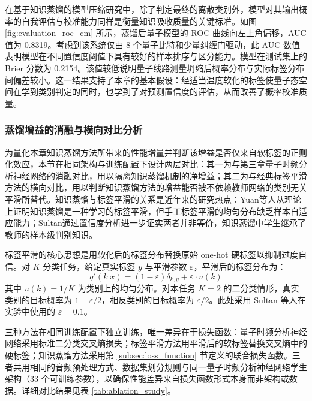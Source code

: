 在基于知识蒸馏的模型压缩研究中，除了判定最终的离散类别外，模型对其输出概率的自我评估与校准能力同样是衡量知识吸收质量的关键标准。如图 \ref{fig:evaluation_roc_cm} 所示，蒸馏后量子模型的 ROC 曲线向左上角偏移，AUC 值为 0.8319。考虑到该系统仅由 8 个量子比特和少量纠缠门驱动，此 AUC 数值表明模型在不同置信度阈值下具有较好的样本排序与区分能力。模型在测试集上的 Brier 分数为 0.2154。该值较低说明量子线路测量坍缩后概率分布与实际标签分布间偏差较小。这一结果支持了本章的基本假设：经适当温度软化的标签使量子态空间在学到类别判定的同时，也学到了对预测置信度的评估，从而改善了概率校准质量。

\subsubsection{蒸馏增益的消融与横向对比分析}
\label{subsec:ablation_study}

为量化本章知识蒸馏方法所带来的性能增量并判断该增益是否仅来自软标签的正则化效应，本节在相同架构与训练配置下设计两层对比：其一为与第三章量子时频分析神经网络的消融对比，用以隔离知识蒸馏机制的净增益；其二为与经典标签平滑方法的横向对比，用以判断知识蒸馏方法的增益能否被不依赖教师网络的类别无关平滑所替代。知识蒸馏与标签平滑的关系是近年来的研究热点：Yuan等人从理论上证明知识蒸馏是一种学习的标签平滑，但手工标签平滑的均匀分布缺乏样本自适应能力；Sultan通过置信度分析进一步证实两者并非等价，知识蒸馏中学生继承了教师的样本级判别知识。

标签平滑的核心思想是用软化后的标签分布替换原始 one-hot 硬标签以抑制过度自信。对 $K$ 分类任务，给定真实标签 $y$ 与平滑参数 $\varepsilon$，平滑后的标签分布为：
\begin{equation}
    q'(k|x) = (1-\varepsilon) \delta_{k, y} + \varepsilon \cdot u(k)
\end{equation}
其中 $u(k) = 1/K$ 为类别上的均匀分布。对本任务 $K=2$ 的二分类情形，真实类别的目标概率为 $1 - \varepsilon/2$，相反类别的目标概率为 $\varepsilon/2$。此处采用 Sultan 等人在实验中使用的 $\varepsilon=0.1$。

三种方法在相同训练配置下独立训练，唯一差异在于损失函数：量子时频分析神经网络采用标准二分类交叉熵损失；标签平滑方法用平滑后的软标签替换交叉熵中的硬标签；知识蒸馏方法采用第 \ref{subsec:loss_function} 节定义的联合损失函数。三者共用相同的音频预处理方式、数据集划分规则与同一量子时频分析神经网络学生架构（33 个可训练参数），以确保性能差异来自损失函数形式本身而非架构或数据。详细对比结果见表 \ref{tab:ablation_study}。

